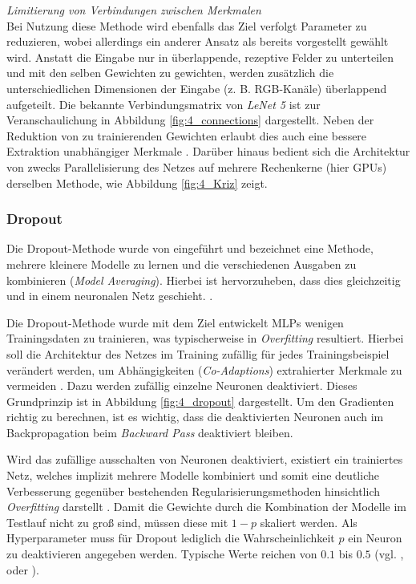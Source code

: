 \textit{Limitierung von Verbindungen zwischen Merkmalen} \\
Bei Nutzung diese Methode wird ebenfalls das Ziel verfolgt Parameter zu reduzieren, wobei allerdings ein anderer Ansatz als bereits vorgestellt gewählt wird. Anstatt die Eingabe nur in über\-lapp\-ende, rezeptive Felder zu unterteilen und mit den selben Gewichten zu gewichten, werden zusätzlich die unterschiedlichen Dimensionen der Eingabe (z. B. RGB-Kanäle) überlappend aufgeteilt. Die bekannte Verbindungsmatrix von \textit{LeNet 5} ist zur Veranschaulichung in Abbildung \ref{fig:4_connections} dargestellt.
Neben der Reduktion von zu trainierenden Gewichten erlaubt dies auch eine bessere Extraktion unabhängiger Merkmale \cite[vgl.][]{LeCun1998}. Darüber hinaus bedient sich die Architektur von \cite{Krizhevsky2012} zwecks Parallelisierung des Netzes auf mehrere Rechenkerne (hier GPUs) derselben Methode, wie Abbildung \ref{fig:4_Kriz} zeigt.\\


\subsubsection{Dropout}
\label{ch:dropout}
Die Dropout-Methode wurde von \cite{Hinton2012} eingeführt und bezeichnet eine Methode, mehrere kleinere Modelle zu lernen und die verschiedenen Ausgaben zu kombinieren (\textit{Model Averaging}). Hierbei ist hervorzuheben, dass dies gleichzeitig und in einem neuronalen Netz geschieht. \cite[vgl.][]{Srivastava2014}.

Die Dropout-Methode wurde mit dem Ziel entwickelt MLPs wenigen Trainingsdaten zu trainieren, was typischerweise in \textit{Overfitting} resultiert. Hierbei soll die Architektur des Netzes im Training zufällig für jedes Trainingsbeispiel verändert werden, um Abhängigkeiten (\textit{Co-Adaptions}) extrahierter Merkmale zu vermeiden \cite[vgl.][]{Hinton2012}. Dazu werden zufällig einzelne Neuronen deaktiviert. Dieses Grundprinzip ist in Abbildung \ref{fig:4_dropout} dargestellt. Um den Gradienten richtig zu berechnen, ist es wichtig, dass die deaktivierten Neuronen auch im Backpropagation beim \textit{Backward Pass} deaktiviert bleiben.

Wird das zufällige ausschalten von Neuronen deaktiviert, existiert ein trainiertes Netz, welches implizit mehrere Modelle kombiniert und somit eine deutliche Verbesserung gegenüber bestehenden Regularisierungsmethoden hinsichtlich \textit{Overfitting} darstellt \cite[vgl.][]{Srivastava2014}. Damit die Gewichte durch die Kombination der Modelle im Testlauf nicht zu groß sind, müssen diese mit ${1-p}$ skaliert werden. 
Als Hyperparameter muss für Dropout lediglich die Wahrscheinlichkeit $p$ ein Neuron zu deaktivieren angegeben werden. Typische Werte reichen von $0.1$ bis $0.5$ (vgl. \cite{Krizhevsky2012}, \cite{Srivastava2014} oder \cite{Simonyan2014}).

